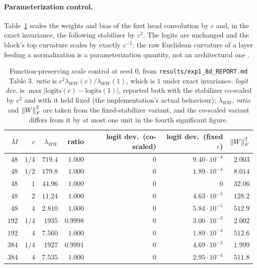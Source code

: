 \paragraph{Parameterization control.} Table~\ref{tab:app_scale} scales the
weights and bias of the first head convolution by $c$ and, in the exact
invariance, the following stabilizer by $c^2$. The logits are unchanged and the
block's top curvature scales by exactly $c^{-2}$: the raw Euclidean curvature
of a layer feeding a normalization is a parameterization quantity, not an
architectural one \citep{vanlaarhoven2017l2}.

\begin{table}[htbp]
\centering
\small
\caption{Function-preserving scale control at seed $0$, from
\texttt{results/exp1\_8d\_REPORT.md} Table 3. \emph{ratio} is
$c^2\lambda_{WW}(c)/\lambda_{WW}(1)$, which is $1$ under exact invariance.
\emph{logit dev.} is $\max|\text{logits}(c) - \text{logits}(1)|$, reported both
with the stabilizer co-scaled by $c^2$ and with it held fixed (the
implementation's actual behaviour); $\lambda_{WW}$, \emph{ratio} and
$\left\lVert W\right\rVert_F^2$ are taken from the fixed-stabilizer variant, and the co-scaled
variant differs from it by at most one unit in the fourth significant figure.}
\label{tab:app_scale}
\begin{tabular}{rrrrrrr}
\toprule
$M$ & $c$ & $\lambda_{WW}$ & ratio & logit dev.\ (co-scaled) & logit dev.\ (fixed $\varepsilon$) & $\left\lVert W\right\rVert_F^2$ \\
\midrule
$48$  & $1/4$ & $719.4$ & $1.000$ & $0$ & $9.40\cdot10^{-4}$ & $2.003$ \\
$48$  & $1/2$ & $179.8$ & $1.000$ & $0$ & $1.89\cdot10^{-4}$ & $8.014$ \\
$48$  & $1$   & $44.96$ & $1.000$ & $0$ & $0$ & $32.06$ \\
$48$  & $2$   & $11.24$ & $1.000$ & $0$ & $4.63\cdot10^{-5}$ & $128.2$ \\
$48$  & $4$   & $2.810$ & $1.000$ & $0$ & $5.84\cdot10^{-5}$ & $512.9$ \\
$192$ & $1/4$ & $1935$  & $0.9998$ & $0$ & $3.00\cdot10^{-3}$ & $2.002$ \\
$192$ & $4$   & $7.560$ & $1.000$ & $0$ & $1.89\cdot10^{-4}$ & $512.6$ \\
$384$ & $1/4$ & $1927$  & $0.9991$ & $0$ & $4.69\cdot10^{-3}$ & $1.999$ \\
$384$ & $4$   & $7.535$ & $1.000$ & $0$ & $2.95\cdot10^{-4}$ & $511.8$ \\
\bottomrule
\end{tabular}
\end{table}


